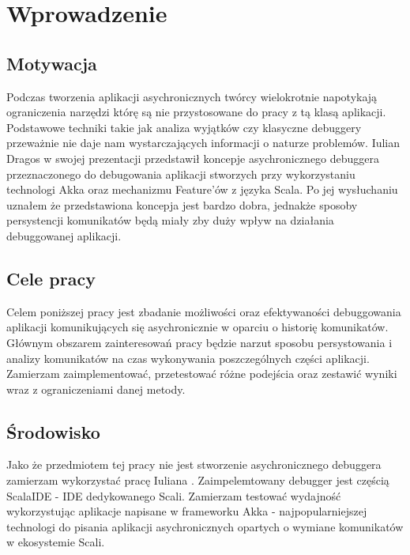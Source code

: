 \chapter{Wprowadzenie}


\section{Motywacja}

Podczas tworzenia aplikacji asychronicznych twórcy wielokrotnie napotykają ograniczenia narzędzi którę są nie przystosowane do pracy z tą klasą aplikacji. Podstawowe techniki takie jak analiza wyjątków czy klasyczne debuggery przeważnie nie daje nam wystarczających informacji o naturze problemów. Iulian Dragos w swojej prezentacji  \cite{rethingningDebugger} przedstawił koncepje asychronicznego debuggera przeznaczonego do debugowania aplikacji stworzych przy wykorzystaniu technologi Akka oraz mechanizmu Feature'ów z języka Scala. Po jej wysłuchaniu uznałem że przedstawiona koncepja jest bardzo dobra, jednakże sposoby persystencji komunikatów będą miały zby duży wpływ na działania debuggowanej aplikacji.

\section{Cele pracy}

Celem poniższej pracy jest zbadanie możliwości oraz efektywaności debuggowania aplikacji komunikujących się asychronicznie w oparciu o historię komunikatów. Głównym obszarem zainteresowań pracy będzie narzut sposobu persystowania i analizy komunikatów na czas wykonywania poszczególnych części aplikacji. Zamierzam zaimplementować, przetestować różne podejścia oraz zestawić wyniki wraz z ograniczeniami danej metody.

\section{Środowisko}

Jako że przedmiotem tej pracy nie jest stworzenie asychronicznego debuggera zamierzam wykorzystać pracę Iuliana \cite{asychDebuggerGh}. Zaimpelemtowany debugger jest częścią ScalaIDE - IDE dedykowanego Scali. Zamierzam testować wydajność wykorzystując aplikacje napisane w frameworku Akka - najpopularniejszej technologi do pisania aplikacji asychronicznych opartych o wymiane komunikatów w ekosystemie Scali.
















